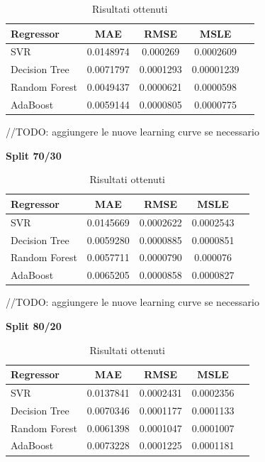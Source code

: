 \begin{table}[H]
    \centering
    \begin{tabular}{|>{\centering\arraybackslash}m{5cm}|c|c|c|c|}
        \hline
        \textbf{Regressor} & \textbf{MAE} & \textbf{RMSE} & \textbf{MSLE} \\ [10pt]
        \hline
        SVR & 0.0148974 & 0.000269 & 0.0002609 \\ [10pt]
        \hline
        Decision Tree & 0.0071797 & 0.0001293 & 0.00001239 \\ [10pt]
        \hline
        Random Forest & 0.0049437 & 0.0000621 & 0.0000598 \\ [10pt]
        \hline
        AdaBoost & 0.0059144 & 0.0000805 & 0.0000775 \\ [10pt]
        \hline
    \end{tabular}
    \caption*{Risultati ottenuti}
    \label{tab:results}
\end{table}

//TODO: aggiungere le nuove learning curve se necessario

\textbf{Split 70/30}


\begin{table}[H]
    \centering
    \begin{tabular}{|>{\centering\arraybackslash}m{5cm}|c|c|c|c|}
        \hline
        \textbf{Regressor} & \textbf{MAE} & \textbf{RMSE} & \textbf{MSLE} \\ [10pt]
        \hline
        SVR & 0.0145669 & 0.0002622 & 0.0002543 \\ [10pt]
        \hline
        Decision Tree & 0.0059280 & 0.0000885 & 0.0000851 \\ [10pt]
        \hline
        Random Forest & 0.0057711 & 0.0000790 & 0.000076 \\ [10pt]
        \hline
        AdaBoost & 0.0065205 & 0.0000858 & 0.0000827 \\ [10pt]
        \hline
    \end{tabular}
    \caption*{Risultati ottenuti}
    \label{tab:results}
\end{table}

//TODO: aggiungere le nuove learning curve se necessario


\textbf{Split 80/20}


\begin{table}[H]
    \centering
    \begin{tabular}{|>{\centering\arraybackslash}m{5cm}|c|c|c|c|}
        \hline
        \textbf{Regressor} & \textbf{MAE} & \textbf{RMSE} & \textbf{MSLE} \\ [10pt]
        \hline
        SVR & 0.0137841 & 0.0002431 & 0.0002356 \\ [10pt]
        \hline
        Decision Tree & 0.0070346 & 0.0001177 & 0.0001133 \\ [10pt]
        \hline
        Random Forest & 0.0061398 & 0.0001047 & 0.0001007 \\ [10pt]
        \hline
        AdaBoost & 0.0073228 & 0.0001225 & 0.0001181 \\ [10pt]
        \hline
    \end{tabular}
    \caption*{Risultati ottenuti}
    \label{tab:results}
\end{table}


